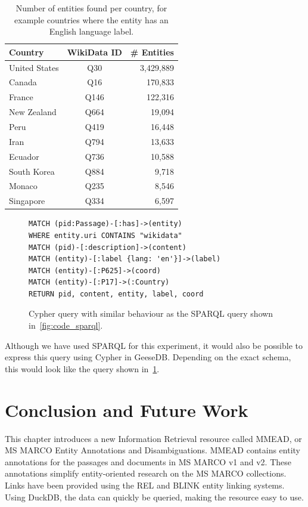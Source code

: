 \begin{table}[]
	\caption{Number of entities found per country, for example countries where the entity has an English language label.}
	\label{tab:country_entities}
	\centering
	\begin{tabular}{l|c|r}
		\toprule
		Country & WikiData ID & \# Entities\\
		\midrule
		United States & Q30 & 3,429,889 \\
		Canada & Q16 & 170,833 \\
		France & Q146 & 122,316 \\
		New Zealand & Q664 & 19,094\\
		Peru & Q419 & 16,448 \\
		Iran & Q794 & 13,633\\
		Ecuador & Q736 & 10,588 \\
		South Korea & Q884 & 9,718\\
		Monaco & Q235 & 8,546\\
		Singapore & Q334 & 6,597\\
		\bottomrule
	\end{tabular}
\end{table}

\begin{figure}
	\centering
	\begin{verbatim}
MATCH (pid:Passage)-[:has]->(entity)
WHERE entity.uri CONTAINS "wikidata"
MATCH (pid)-[:description]->(content)
MATCH (entity)-[:label {lang: 'en'}]->(label)
MATCH (entity)-[:P625]->(coord)
MATCH (entity)-[:P17]->(:Country)
RETURN pid, content, entity, label, coord
	\end{verbatim}
	\caption{Cypher query with similar behaviour as the SPARQL query shown in~\ref{fig:code_sparql}.}
	\label{fig:code_geese}
\end{figure}

Although we have used SPARQL for this experiment, it would also be possible to express this query using Cypher in GeeseDB. Depending on the exact schema, this would look like the query shown in~\cref{fig:code_geese}.

\section{Conclusion and Future Work}
This chapter introduces a new Information Retrieval resource called MMEAD, or MS MARCO Entity Annotations and Disambiguations. MMEAD contains entity annotations for the passages and documents in MS MARCO v1 and v2. These annotations simplify entity-oriented research on the MS MARCO collections. Links have been provided using the REL and BLINK entity linking systems. Using DuckDB, the data can quickly be queried, making the resource easy to use.
 
